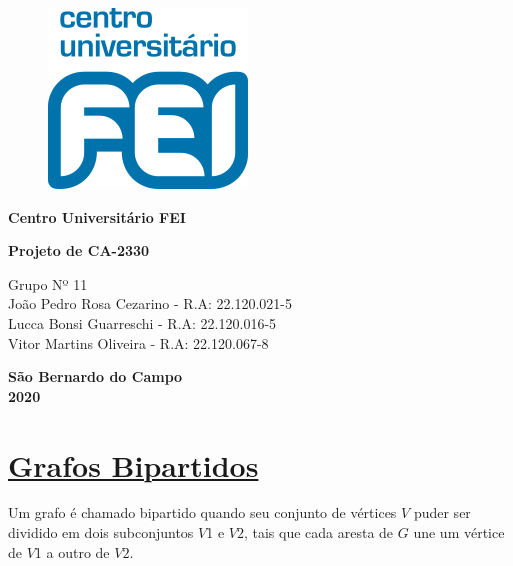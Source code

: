 \documentclass{article}
\begin{document}
\begin{titlepage}
	\begin{figure}[H]
		\centering
		\includegraphics[width=0.1\linewidth]{Figuras/logofei}
		\label{fig:logofei}
	\end{figure}
	
	\begin{center}
		{\large \textbf{Centro Universitário FEI} }
	\end{center}
	
	\vspace*{3cm}
	
	\begin{center}
		{\Large {\bf{ Projeto de CA-2330 \\ 
					\vspace*{0.5cm}{\large Relatório - Parte 3}}}}
	\end{center}\vspace*{5cm}
	
	\begin{center}
		Grupo Nº 11 \vspace*{0.2cm} \\ João Pedro Rosa Cezarino - R.A: 22.120.021-5  \\ Lucca Bonsi Guarreschi - R.A: 22.120.016-5  \\ Vitor Martins Oliveira - R.A: 22.120.067-8
	\end{center}
	
	\vspace*{7cm}
	\begin{center} \textbf{São Bernardo do Campo \\ 2020}\end{center}
	
\end{titlepage}
	\newpage
	\setcounter{page}{1} %
	
	\section{{\Large \underline{Grafos Bipartidos}}}
		Um grafo é chamado bipartido quando seu conjunto de vértices $V$ puder ser dividido em dois subconjuntos $V$1 e $V2$, tais que cada aresta de $G$ une um vértice de $V$1 a outro de $V2$.\vspace*{0.2cm}
		
\end{document}
